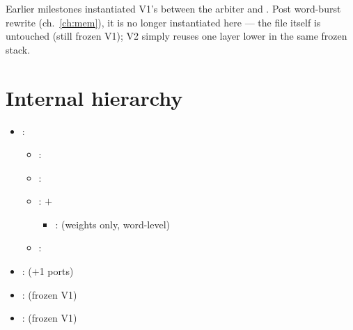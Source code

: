 \begin{fnnote}
Earlier milestones instantiated V1's 
between the arbiter and . Post word-burst
rewrite (ch.~\ref{ch:mem}), it is no longer instantiated here --- the
file itself is untouched (still frozen V1); V2 simply reuses one layer
lower in the same frozen stack.
\end{fnnote}

\section{Internal hierarchy}
\noindent{}
\begin{itemize}[leftmargin=2.4em]
\footnotesize
\item {} : 
  \begin{itemize}
    \item {} : 
    \item {} : 
    \item {}:  $+$ 
      \begin{itemize}
        \item[--]  :  (weights only, word-level)
      \end{itemize}
    \item {} : 
  \end{itemize}
\item {} :  ($+$1 ports)
\item {} :  (frozen V1)
\item {} :  (frozen V1)
\end{itemize}
